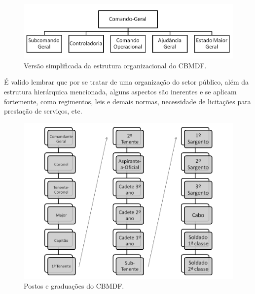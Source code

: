   \begin{figure}[!htbp]
    \centering
    \includegraphics[scale=0.5]{editaveis/figuras/organograma_simplificado_cbmdf}
    \caption[Versão simplificada da estrutura organizacional do CBMDF]{Versão simplificada da estrutura organizacional do CBMDF. \footnotemark}
    \label{organograma_simplificado_cbmdf}
  \end{figure}
  
  É valido lembrar que por se tratar de uma organização do setor público, além da estrutura hierárquica mencionada, alguns
  aspectos são inerentes e se aplicam fortemente, como regimentos, leis e demais normas, necessidade de licitações para prestação
  de serviços, etc.
  
  \begin{figure}[!htbp]
    \centering
    \includegraphics[scale=0.5]{editaveis/figuras/patentes_cbmdf}
    \caption[Postos e graduações do CBMDF]{Postos e graduações do CBMDF. \footnotemark}
    \label{patentes_cbmdf}
  \end{figure}
  
  
  \vfill
  
  